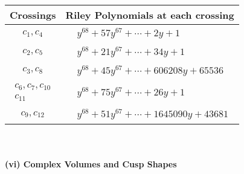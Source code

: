 \documentclass[1p]{elsarticle_modified}
\theoremstyle{definition}
\begin{document}
\begin{tabular}{m{50pt}|m{274pt}}
Crossings & \hspace{64pt}Riley Polynomials at each crossing \\
\hline $$\begin{aligned}c_{1},c_{4}\end{aligned}$$&$\begin{aligned}
&y^{68}+57 y^{67}+\cdots+2 y+1
\end{aligned}$\\
\hline $$\begin{aligned}c_{2},c_{5}\end{aligned}$$&$\begin{aligned}
&y^{68}+21 y^{67}+\cdots+34 y+1
\end{aligned}$\\
\hline $$\begin{aligned}c_{3},c_{8}\end{aligned}$$&$\begin{aligned}
&y^{68}+45 y^{67}+\cdots+606208 y+65536
\end{aligned}$\\
\hline $$\begin{aligned}c_{6},c_{7},c_{10}\\c_{11}\end{aligned}$$&$\begin{aligned}
&y^{68}+75 y^{67}+\cdots+26 y+1
\end{aligned}$\\
\hline $$\begin{aligned}c_{9},c_{12}\end{aligned}$$&$\begin{aligned}
&y^{68}+51 y^{67}+\cdots+1645090 y+43681
\end{aligned}$\\
\hline
\end{tabular}\\~\\
\newpage\flushleft \textbf{(vi) Complex Volumes and Cusp Shapes}
\end{document}
